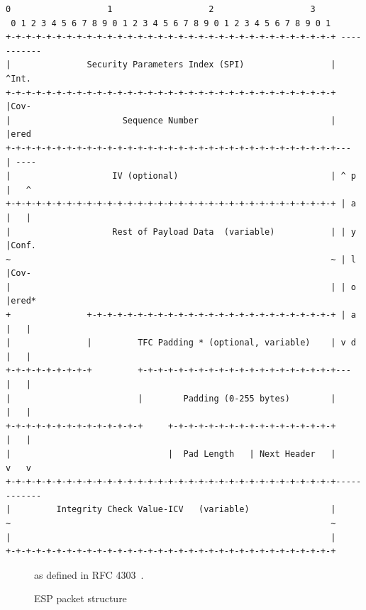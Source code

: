 \begin{lrbox}{\myv}\begin{minipage}{\textwidth}
\begin{verbatim}
0                   1                   2                   3
 0 1 2 3 4 5 6 7 8 9 0 1 2 3 4 5 6 7 8 9 0 1 2 3 4 5 6 7 8 9 0 1
+-+-+-+-+-+-+-+-+-+-+-+-+-+-+-+-+-+-+-+-+-+-+-+-+-+-+-+-+-+-+-+-+ -----------
|               Security Parameters Index (SPI)                 |      ^Int.
+-+-+-+-+-+-+-+-+-+-+-+-+-+-+-+-+-+-+-+-+-+-+-+-+-+-+-+-+-+-+-+-+      |Cov-
|                      Sequence Number                          |      |ered
+-+-+-+-+-+-+-+-+-+-+-+-+-+-+-+-+-+-+-+-+-+-+-+-+-+-+-+-+-+-+-+-+---   | ----
|                    IV (optional)                              | ^ p  |   ^
+-+-+-+-+-+-+-+-+-+-+-+-+-+-+-+-+-+-+-+-+-+-+-+-+-+-+-+-+-+-+-+-+ | a  |   |
|                    Rest of Payload Data  (variable)           | | y  |Conf.
~                                                               ~ | l  |Cov-
|                                                               | | o  |ered*
+               +-+-+-+-+-+-+-+-+-+-+-+-+-+-+-+-+-+-+-+-+-+-+-+-+ | a  |   |
|               |         TFC Padding * (optional, variable)    | v d  |   |
+-+-+-+-+-+-+-+-+         +-+-+-+-+-+-+-+-+-+-+-+-+-+-+-+-+-+-+-+---   |   |
|                         |        Padding (0-255 bytes)        |      |   |
+-+-+-+-+-+-+-+-+-+-+-+-+-+     +-+-+-+-+-+-+-+-+-+-+-+-+-+-+-+-+      |   |
|                               |  Pad Length   | Next Header   |      v   v
+-+-+-+-+-+-+-+-+-+-+-+-+-+-+-+-+-+-+-+-+-+-+-+-+-+-+-+-+-+-+-+-+------------
|         Integrity Check Value-ICV   (variable)                |
~                                                               ~
|                                                               |
+-+-+-+-+-+-+-+-+-+-+-+-+-+-+-+-+-+-+-+-+-+-+-+-+-+-+-+-+-+-+-+-+
\end{verbatim}
\end{minipage}\end{lrbox}

\begin{figure}
\center
	\resizebox{.8\linewidth}{!}{%
	\usebox\myv
	}
\caption{ESP packet structure}{as defined in RFC 4303~\cite{rfc4303}.}
\label{fig:esp-packet-structure}
\end{figure}